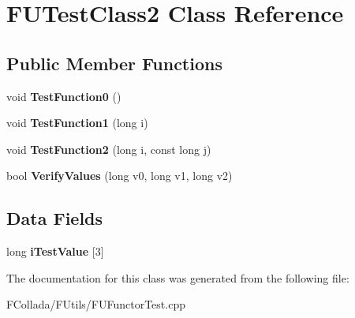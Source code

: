 \hypertarget{classFUTestClass2}{
\section{FUTestClass2 Class Reference}
\label{classFUTestClass2}
}
\subsection*{Public Member Functions}
\begin{DoxyCompactItemize}
\item 
\hypertarget{classFUTestClass2_a266da84a3a207231a61294479ed6a7ff}{
void {\bfseries TestFunction0} ()}
\label{classFUTestClass2_a266da84a3a207231a61294479ed6a7ff}

\item 
\hypertarget{classFUTestClass2_a0be394557ab299e2519673e748942ba2}{
void {\bfseries TestFunction1} (long i)}
\label{classFUTestClass2_a0be394557ab299e2519673e748942ba2}

\item 
\hypertarget{classFUTestClass2_a5deb570cf1ba7bed93f37b4d53519a43}{
void {\bfseries TestFunction2} (long i, const long j)}
\label{classFUTestClass2_a5deb570cf1ba7bed93f37b4d53519a43}

\item 
\hypertarget{classFUTestClass2_a2797e12c40e748a353edd6346283dab7}{
bool {\bfseries VerifyValues} (long v0, long v1, long v2)}
\label{classFUTestClass2_a2797e12c40e748a353edd6346283dab7}

\end{DoxyCompactItemize}
\subsection*{Data Fields}
\begin{DoxyCompactItemize}
\item 
\hypertarget{classFUTestClass2_a0194bbbac02ecc4f34968018d7bc5738}{
long {\bfseries iTestValue} \mbox{[}3\mbox{]}}
\label{classFUTestClass2_a0194bbbac02ecc4f34968018d7bc5738}

\end{DoxyCompactItemize}


The documentation for this class was generated from the following file:\begin{DoxyCompactItemize}
\item 
FCollada/FUtils/FUFunctorTest.cpp\end{DoxyCompactItemize}
